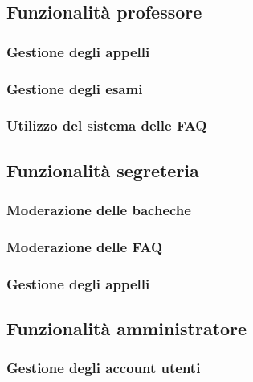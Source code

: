 \documentclass [a4paper,11pt]{book}
\begin{document}
\medskip

\subsection{Funzionalità professore}

\subsubsection{Gestione degli appelli}

\medskip

\subsubsection{Gestione degli esami}

\medskip

\subsubsection{Utilizzo del sistema delle FAQ}

\medskip

\subsection{Funzionalità segreteria}

\subsubsection{Moderazione delle bacheche}

\medskip

\subsubsection{Moderazione delle FAQ}

\medskip

\subsubsection{Gestione degli appelli}

\medskip

\subsection{Funzionalità amministratore}

\subsubsection{Gestione degli account utenti}
\end{document}
